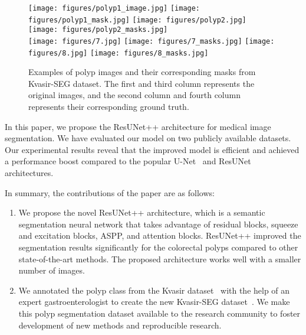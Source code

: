 \documentclass[conference]{IEEEtran}
\newcommand{\resunetplusplus}{ResUNet++\xspace}
\begin{document}
 
\begin{figure}
 \centering
        \texttt{[image: figures/polyp1\_image.jpg]}
        \texttt{[image: figures/polyp1\_mask.jpg]}
        \texttt{[image: figures/polyp2.jpg]}
        \texttt{[image: figures/polyp2\_masks.jpg]} \\
        \vspace{1mm}
        \texttt{[image: figures/7.jpg]}
        \texttt{[image: figures/7\_masks.jpg]}
        \texttt{[image: figures/8.jpg]}
        \texttt{[image: figures/8\_masks.jpg]}
    
    \caption{Examples of polyp images and their corresponding masks from Kvasir-SEG dataset. The first and third column represents the original images, and the second column and fourth column represents their corresponding ground truth.}
    \label{fig:polyp_with_mask}
      \vspace{-5mm}
\end{figure}











 
In this paper, we propose the \resunetplusplus architecture for medical image segmentation. We have evaluated our model on two publicly available datasets. Our experimental results reveal that the improved model is efficient and achieved a performance boost compared to the popular U-Net~\cite{ronneberger2015u} and ResUNet~\cite{zhang2018road} architectures. 


In summary, the contributions of the paper are as follows:
\begin{enumerate}
\item We propose the novel \resunetplusplus architecture, which is a semantic segmentation neural network that takes advantage of residual blocks, squeeze and excitation blocks, \ac{ASPP}, and attention blocks. \resunetplusplus improved the segmentation results significantly for the colorectal polyps compared to other state-of-the-art methods. The proposed architecture works well with a smaller number of images.  

\item We annotated the polyp class from the Kvasir dataset~\cite{pogorelov2017kvasir} with the help of an expert gastroenterologist to create the new Kvasir-SEG dataset~\cite{debeshkvasir-SEG}. 
We make this polyp segmentation dataset available to the research community to foster development of new methods and  reproducible research. 

\end{enumerate}
\end{document}
